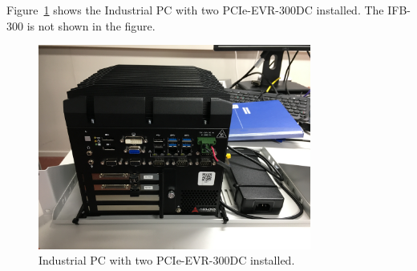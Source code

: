 \documentclass[11pt
  , a4paper
  , article
  , oneside
  , showtrims
]{memoir}
\begin{document}
Figure~\ref{fig:ipc} shows the Industrial PC with two PCIe-EVR-300DC installed. The IFB-300 is not shown in the figure.
\begin{figure}[!b]
  \centering
  \includegraphics[width=0.8\textwidth]{./pictures/ipc.jpg}
  \caption{Industrial PC with two PCIe-EVR-300DC installed.}
  \label{fig:ipc}
\end{figure}


\clearpage
\end{document}

